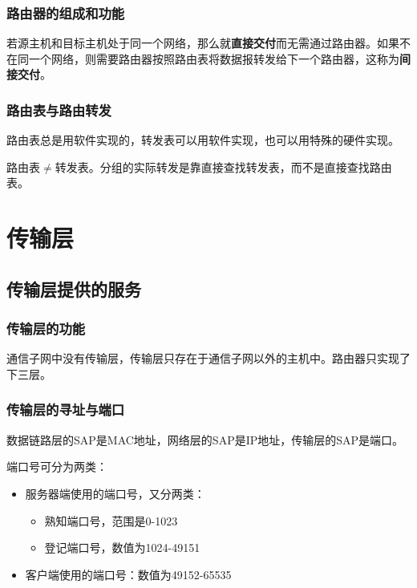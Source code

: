 \documentclass[12pt, a4paper, oneside]{ctexart}
\begin{document}
\subsubsection{路由器的组成和功能}

若源主机和目标主机处于同一个网络，那么就\textbf{直接交付}而无需通过路由器。如果不在同一个网络，则需要路由器按照路由表将数据报转发给下一个路由器，这称为\textbf{间接交付}。

\subsubsection{路由表与路由转发}

路由表总是用软件实现的，转发表可以用软件实现，也可以用特殊的硬件实现。

路由表$\neq$转发表。分组的实际转发是靠直接查找转发表，而不是直接查找路由表。

\section{传输层}

\subsection{传输层提供的服务}

\subsubsection{传输层的功能}

通信子网中没有传输层，传输层只存在于通信子网以外的主机中。路由器只实现了下三层。

\subsubsection{传输层的寻址与端口}

数据链路层的SAP是MAC地址，网络层的SAP是IP地址，传输层的SAP是端口。

端口号可分为两类：
\begin{itemize}
    \item 服务器端使用的端口号，又分两类：
    \begin{itemize}
        \item 熟知端口号，范围是0-1023
        \item 登记端口号，数值为1024-49151
    \end{itemize}
    \item 客户端使用的端口号：数值为49152-65535
\end{itemize}
\end{document}
